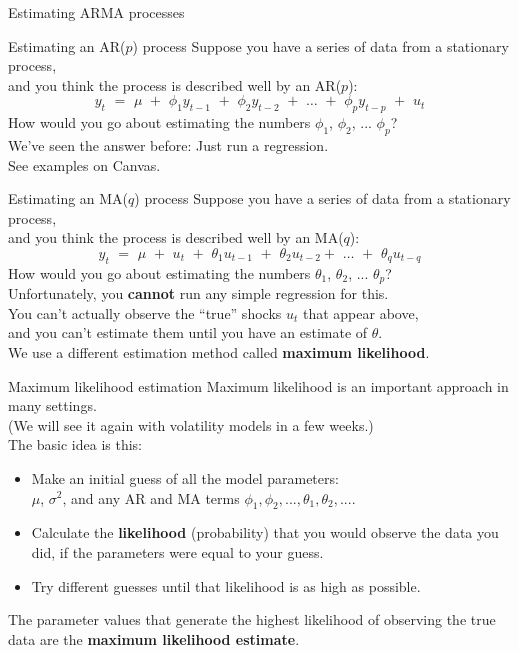\documentclass[t,12pt]{beamer}
\begin{document}
\begin{frame}[c]
\vfill
\centerline{Estimating ARMA processes}
\vfill
\end{frame}

\begin{frame}[c]{Estimating an AR($p$) process}
Suppose you have a series of data from a stationary process,
\\ and you think the process is described well by an AR($p$):
$$
y_t \,\, = \,\, \mu \,\, + \,\, \phi_1 y_{t-1} \,\, + \,\, \phi_2 y_{t-2} \,\, + \,\, \dots \,\, + \,\, \phi_p y_{t-p} \,\, + \,\, u_t
$$
How would you go about estimating the numbers $\phi_1$, $\phi_2$, ... $\phi_p$?
\\ \medskip
We've seen the answer before: Just run a regression. 
\\ See examples on Canvas.
\end{frame}

\begin{frame}[c]{Estimating an MA($q$) process}
Suppose you have a series of data from a stationary process,
\\ and you think the process is described well by an MA($q$):
$$
y_t \,\, = \,\, \mu \,\, + \,\, u_t \,\, + \,\, \theta_1 u_{t-1} \,\, + \,\, \theta_2 u_{t-2} + \,\, \dots \,\, + \,\, \theta_q u_{t-q}
$$
How would you go about estimating the numbers $\theta_1$, $\theta_2$, ... $\theta_p$?
\\ \bigskip
Unfortunately, you \textbf{cannot} run any simple regression for this.
\\ You can't actually observe the ``true'' shocks $u_t$ that appear above,
\\ and you can't estimate them until you have an estimate of $\theta$.
\\ \bigskip
We use a different estimation method called \textbf{maximum likelihood}.
\end{frame}

\begin{frame}[c]{Maximum likelihood estimation}
Maximum likelihood is an important approach in many settings. 
\\ (We will see it again with volatility models in a few weeks.)
\\ \bigskip The basic idea is this:
\begin{itemize}
\medskip
\item Make an initial guess of all the model parameters:
\\ $\mu$, $\sigma^2$, and any AR and MA terms $\phi_1,\phi_2,...,\theta_1,\theta_2,...$.
\smallskip
\item Calculate the \textbf{likelihood} (probability) that you would observe the data you did, if the parameters were equal to your guess.
\smallskip
\item Try different guesses until that likelihood is as high as possible.
\end{itemize}
\bigskip
The parameter values that generate the highest likelihood of observing the true data are the \textbf{maximum likelihood estimate}.
\end{frame}
\end{document}
